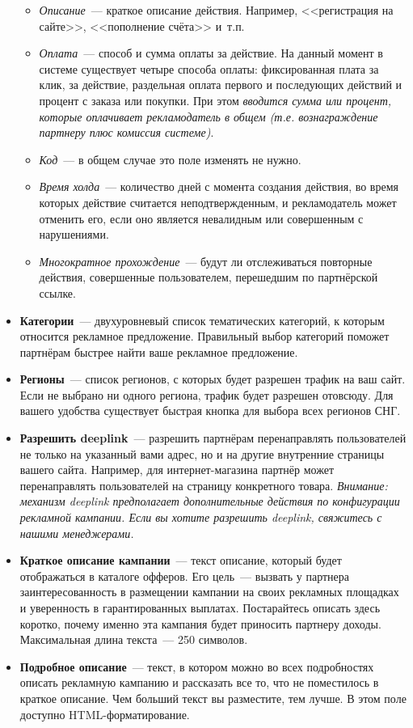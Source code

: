 \documentclass[a4paper,12pt]{article}
\begin{document}
\begin{itemize}
	\begin{itemize}
	\item \textit{Описание}~--- краткое описание действия. Например, <<регистрация на сайте>>, <<пополнение счёта>> и~т.п.
	\item \textit{Оплата}~--- способ и сумма оплаты за действие. На данный момент в системе существует четыре способа оплаты: фиксированная плата за клик, за действие, раздельная оплата первого и последующих действий и процент с заказа или покупки. При этом \textit{вводится сумма или процент, которые оплачивает рекламодатель в общем (т.е. вознаграждение партнеру плюс комиссия системе)}.
	\item \textit{Код}~--- в общем случае это поле изменять не нужно.
	\item \textit{Время холда}~--- количество дней с момента создания действия, во время которых действие считается неподтвержденным, и рекламодатель может отменить его, если оно является невалидным или совершенным с нарушениями.
	\item \textit{Многократное прохождение}~--- будут ли отслеживаться повторные действия, совершенные пользователем, перешедшим по партнёрской ссылке.
	\end{itemize}

\item \textbf{Категории}~--- двухуровневый список тематических категорий, к которым относится рекламное предложение. Правильный выбор категорий поможет партнёрам быстрее найти ваше рекламное предложение.
\item \textbf{Регионы}~--- список регионов, с которых будет разрешен трафик на ваш сайт. Если не выбрано ни одного региона, трафик будет разрешен отовсюду. Для вашего удобства существует быстрая кнопка для выбора всех регионов СНГ.
\item \textbf{Разрешить deeplink}~--- разрешить партнёрам перенаправлять пользователей не только на указанный вами адрес, но и на другие внутренние страницы вашего сайта. Например, для интернет-магазина партнёр может перенаправлять пользователей на страницу конкретного товара. \textit{Внимание: механизм deeplink предполагает дополнительные действия по конфигурации рекламной кампании. Если вы хотите разрешить deeplink, свяжитесь с нашими менеджерами.}
\item \textbf{Краткое описание кампании}~--- текст описание, который будет отображаться в каталоге офферов. Его цель~--- вызвать у партнера заинтересованность в размещении кампании на своих рекламных площадках и уверенность в гарантированных выплатах. Постарайтесь описать здесь коротко, почему именно эта кампания будет приносить партнеру доходы. Максимальная длина текста~--- 250 символов.
\item \textbf{Подробное описание}~--- текст, в котором можно во всех подробностях описать рекламную кампанию и рассказать все то, что не поместилось в краткое описание. Чем больший текст вы разместите, тем лучше. В этом поле доступно HTML-форматирование.
\end{itemize}
\end{document}
